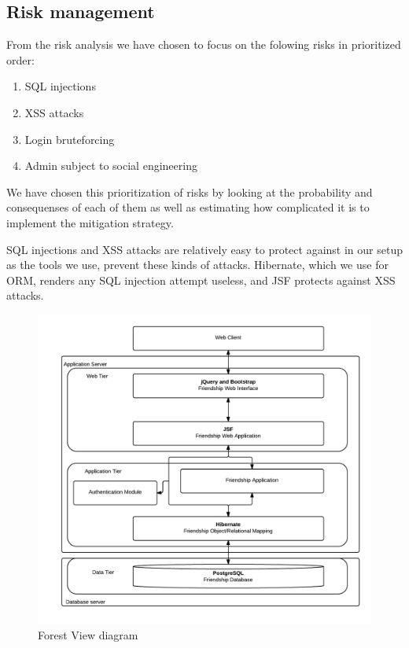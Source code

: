 \documentclass[a4paper]{article}
\begin{document}
\subsection{Risk management}
From the risk analysis we have chosen to focus on the folowing risks in prioritized order:
\begin{enumerate}
\item{SQL injections}
\item{XSS attacks}
\item{Login bruteforcing}
\item{Admin subject to social engineering}
\end{enumerate}

We have chosen this prioritization of risks by looking at the probability and consequenses of each of them as well as estimating how complicated it is to implement the mitigation strategy.

SQL injections and XSS attacks are relatively easy to protect against in our setup as the tools we use, prevent these kinds of attacks. Hibernate, which we use for ORM, renders any SQL injection attempt useless, and JSF protects against XSS attacks.

\begin{figure}[h!]
\centering
\includegraphics[scale=0.3]{ForestView}
\caption{Forest View diagram}
\label{fig:forest_view}
\end{figure}
\end{document}
